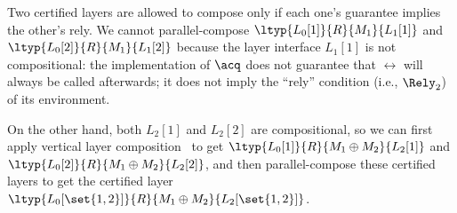 Two certified layers are allowed to compose only if each one's guarantee
implies the other's rely. We cannot parallel-compose
$\ltyp{L_0[1]}{R}{M_1}{L_1[1]}$ and $\ltyp{L_0[2]}{R}{M_1}{L_1[2]}$
because the layer interface $L_1[1]$ is not compositional:
the implementation of $\acq$ does not guarantee that $\rel$ will always be
called afterwards; it does not imply the ``rely'' condition (i.e.,
$\Rely_{2}$) of its environment.

On the other hand, both $L_2[1]$ and $L_2[2]$ are compositional,
so we can first apply vertical layer composition~\cite{dscal15} to get
$\ltyp{L_0[1]}{R}{M_1\oplus{}M_2}{L_2[1]}$ and
$\ltyp{L_0[2]}{R}{M_1\oplus{}M_2}{L_2[2]}$, and then parallel-compose
these certified layers to get the certified layer
$\ltyp{L_0[\set{1,2}]}{R}{M_1\oplus{}M_2}{L_2[\set{1,2}]}$.




